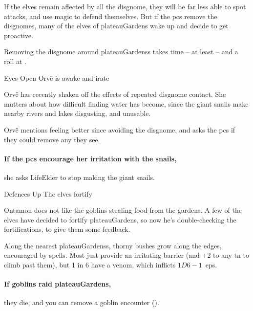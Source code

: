 \begin{multicols}{2}
\noindent
If the elves remain affected by all the \gls{disgnome}, they will be far less able to spot attacks, and use magic to defend themselves.
But if the \glspl{pc} remove the \glspl{disgnome},
many of the elves of \gls{plateauGardens} wake up and decide to get proactive.

Removing the \gls{disgnome} around \glspl{plateauGardens} takes time -- at least  -- and a  roll at \tn[10].

\setcounter{segNo}{-1}

{Eyes Open}%
{Orv\"e is awake and irate}%

Orv\"e has recently shaken off the effects of repeated \gls{disgnome} contact.
She mutters about how difficult finding water has become, since the giant snails make nearby rivers and lakes disgusting, and unusable.

Orv\"e mentions feeling better since avoiding the \gls{disgnome}, and asks the \glspl{pc} if they could remove any they see.


\paragraph{If the \glspl{pc} encourage her irritation with the snails,}
she asks \gls{LifeElder} to stop making the giant snails.


{Defences Up}%
{The elves fortify }%

Ontamon does not like the goblins stealing food from the gardens.
A few of the elves have decided to fortify \gls{plateauGardens}, so now he's double-checking the fortifications, to give them some feedback.

Along the nearest \glspl{plateauGardens}, thorny bushes grow along the edges, encouraged by \glspl{spell}.
Most just provide an irritating barrier (and +2 to any \gls{tn} to climb past them), but 1 in 6 have a venom, which inflicts $1D6-1$~\glspl{ep}.

\paragraph{If goblins raid \gls{plateauGardens},}
they die, and you can remove a goblin encounter ().


\end{multicols}
